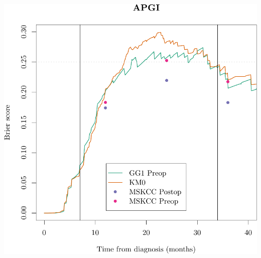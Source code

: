 \documentclass{article}\usepackage[]{graphicx}\usepackage[]{color}
\makeatletter
\def\maxwidth{ %
  \ifdim\Gin@nat@width>\linewidth
    \linewidth
  \else
    \Gin@nat@width
  \fi
}
\newenvironment{knitrout}{}{} %
\makeatother
\begin{document}
\begin{knitrout}
{\centering \includegraphics[width=\maxwidth]{figure/07-prob-bs-paths-plot-apgi-2} 

}



\end{knitrout}
\end{document}
